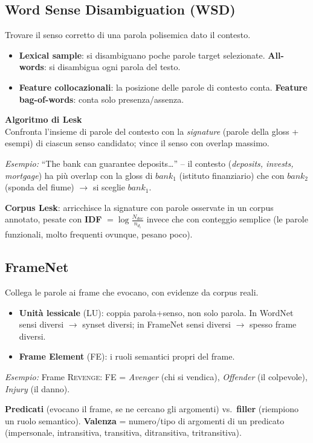 \documentclass[11pt,a4paper]{article}
\newcommand{\formula}[2]{\begin{formulabox}\textbf{#1}\\[3pt]#2\end{formulabox}}
\newcommand{\es}[1]{\begin{esbox}\textit{Esempio:} #1\end{esbox}}
\begin{document}
\subsection*{Word Sense Disambiguation (WSD)}
Trovare il senso corretto di una parola polisemica dato il contesto.
\begin{itemize}
  \item \textbf{Lexical sample}: si disambiguano poche parole target selezionate. \textbf{All-words}: si disambigua ogni parola del testo.
  \item \textbf{Feature collocazionali}: la posizione delle parole di contesto conta. \textbf{Feature bag-of-words}: conta solo presenza/assenza.
\end{itemize}

\formula{Algoritmo di Lesk}{Confronta l'insieme di parole del contesto con la \emph{signature} (parole della gloss + esempi) di ciascun senso candidato; vince il senso con overlap massimo.}
\es{``The bank can guarantee deposits\ldots'' -- il contesto (\textit{deposits, invests, mortgage}) ha pi\`u overlap con la gloss di $bank_1$ (istituto finanziario) che con $bank_2$ (sponda del fiume) $\to$ si sceglie $bank_1$.}

\textbf{Corpus Lesk}: arricchisce la signature con parole osservate in un corpus annotato, pesate con \textbf{IDF} $= \log\frac{N_{doc}}{n_{d_i}}$ invece che con conteggio semplice (le parole funzionali, molto frequenti ovunque, pesano poco).

\subsection*{FrameNet}
Collega le parole ai frame che evocano, con evidenze da corpus reali.
\begin{itemize}
  \item \textbf{Unit\`a lessicale} (LU): coppia parola+senso, non solo parola. In WordNet sensi diversi $\to$ synset diversi; in FrameNet sensi diversi $\to$ spesso frame diversi.
  \item \textbf{Frame Element} (FE): i ruoli semantici propri del frame.
\end{itemize}
\es{Frame \textsc{Revenge}: FE = \emph{Avenger} (chi si vendica), \emph{Offender} (il colpevole), \emph{Injury} (il danno).}

\textbf{Predicati} (evocano il frame, se ne cercano gli argomenti) vs.\ \textbf{filler} (riempiono un ruolo semantico). \textbf{Valenza} = numero/tipo di argomenti di un predicato (impersonale, intransitiva, transitiva, ditransitiva, tritransitiva).
\end{document}
